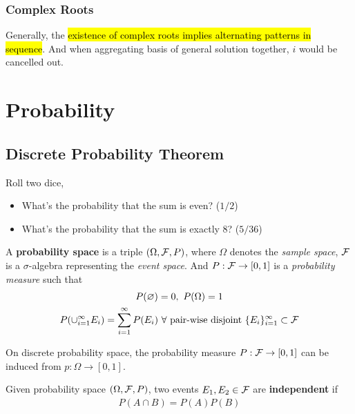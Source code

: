 \documentclass{article}
\begin{document}
				\subsubsection{Complex Roots}
					\begin{remark}
						Generally, the \hl{existence of complex roots implies alternating patterns in sequence}. And when aggregating basis of general solution together, $i$ would be cancelled out.
					\end{remark}
	
	\section{Probability}
		\subsection{Discrete Probability Theorem}
			\begin{example}
				Roll two dice,
				\begin{itemize}
					\item What's the probability that the sum is even? ($1/2$)
					\item What's the probability that the sum is exactly 8? ($5/36$)
				\end{itemize}
			\end{example}
			
			\begin{definition}
				A \textbf{probability space} is a triple $(\Omega, \mathcal{{F}}, P)$, where $\Omega$ denotes the \emph{sample space}, $\mathcal{{F}}$ is a $\sigma$-algebra representing the \emph{event space}. And $P: \mathcal{{F}} \to [0, 1]$ is a \emph{probability measure} such that
				\begin{gather}
					P(\varnothing) = 0,\ 
					P(\Omega) = 1 \\
					P(\cup_{i=1}^\infty E_i) = \sum_{i=1}^\infty P(E_i)\ \forall \tx{ pair-wise disjoint } \{E_i\}_{i=1}^\infty \subset \mc{F}
				\end{gather}
			\end{definition}
			
			\begin{proposition}
				On discrete probability space, the probability measure $P: \mathcal{{F}} \to [0, 1]$ can be induced from $p: \Omega \to [0, 1]$.
			\end{proposition}
			
			\begin{definition}
				Given probability space $(\Omega, \mathcal{{F}}, P)$, two events $E_1, E_2 \in \mathcal{{F}}$ are \textbf{independent} if 
				\begin{gather}
					P(A \cap B) = P(A) P(B)
				\end{gather}
			\end{definition}
			
\end{document}

